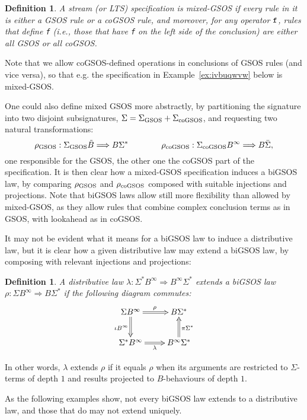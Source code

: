 \documentclass[adraft,copyright,creativecommons]{eptcs}
\newtheorem{definition}[theorem]{Definition}
\newcommand{\To}{\Longrightarrow}
\newcommand{\Bid}{\tilde{B}}
\newcommand{\Bb}{B^{\infty}}
\newcommand{\Sid}{\bar{\S}}
\newcommand{\Ss}{\Sigma^*}
\renewcommand{\S}{\Sigma}
\begin{document}
\begin{definition}\rm
A stream (or LTS) specification is {\em mixed-GSOS} if every rule in it is either a GSOS rule or a coGSOS rule, and moreover, for any operator ${\tt f}$, rules that define {\tt f} (i.e., those that have {\tt f} on the left side of the conclusion) are either all GSOS or all coGSOS.
\end{definition}

Note that we allow coGSOS-defined operations in conclusions of GSOS rules (and vice versa), so that e.g. the specification in Example~\ref{ex:ivbuqwvw} below is mixed-GSOS.

One could also define mixed GSOS more abstractly, by partitioning the signature into two disjoint subsignatures, $\Sigma=\Sigma_{\rm GSOS}+\Sigma_{\rm coGSOS}$, and requesting two natural transformations:
\[
	\rho_{\rm GSOS}:\Sigma_{\rm GSOS}\Bid\To B\Ss \qquad\qquad \rho_{\rm coGSOS}:\Sigma_{\rm coGSOS}\Bb\To B\Sid,
\]
one responsible for the GSOS, the other one the coGSOS part of the specification. It is then clear how a mixed-GSOS specification induces a biGSOS law, by comparing $\rho_{\rm GSOS}$ and $\rho_{\rm coGSOS}$ composed with suitable injections and projections. Note that biGSOS laws allow still more flexibility than allowed by mixed-GSOS, as they allow rules that combine complex conclusion terms as in GSOS, with lookahead as in coGSOS. 

It may not be evident what it means for a biGSOS law to induce a distributive law, but it is clear how a given distributive law may extend a biGSOS law, by composing with relevant injections and projections:
\begin{definition}\label{def:extn}\rm
A distributive law $\lambda:\Ss\Bb\To\Bb\Ss$ {\em extends} a biGSOS law $\rho:\S\Bb\To B\Ss$ if the following diagram commutes:
\begin{equation}\label{eq:ibvneverv}
\vcenter{\xymatrix{
	\Sigma\Bb\ar@{=>}[r]^{\rho}\ar@{=>}[d]_{\iota\Bb} & B\Ss \\
	\Ss\Bb\ar@{=>}[r]_{\lambda} & \Bb\Ss\ar@{=>}[u]_{\pi\Ss}
}}\end{equation}
\end{definition}

In other words, $\lambda$ extends $\rho$ if it equals $\rho$ when its arguments are restricted to $\Sigma$-terms of depth $1$ and results projected to $B$-behaviours of depth $1$.

As the following examples show, not every biGSOS law extends to a distributive law, and those that do may not extend uniquely.
\end{document}
